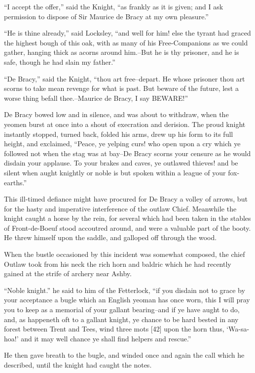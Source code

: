 ``I accept the offer,'' said the Knight, ``as frankly as it is given;
and I ask permission to dispose of Sir Maurice de Bracy at my own
pleasure.''

``He is thine already,'' said Locksley, ``and well for him! else the
tyrant had graced the highest bough of this oak, with as many of his
Free-Companions as we could gather, hanging thick as acorns around
him.--But he is thy prisoner, and he is safe, though he had slain my
father.''

``De Bracy,'' said the Knight, ``thou art free--depart. He whose
prisoner thou art scorns to take mean revenge for what is past. But
beware of the future, lest a worse thing befall thee.--Maurice de Bracy,
I say BEWARE!''

De Bracy bowed low and in silence, and was about to withdraw, when the
yeomen burst at once into a shout of execration and derision. The proud
knight instantly stopped, turned back, folded his arms, drew up his form
to its full height, and exclaimed, ``Peace, ye yelping curs! who open
upon a cry which ye followed not when the stag was at bay--De Bracy
scorns your censure as he would disdain your applause. To your brakes
and caves, ye outlawed thieves! and be silent when aught knightly or
noble is but spoken within a league of your fox-earths.''

This ill-timed defiance might have procured for De Bracy a volley of
arrows, but for the hasty and imperative interference of the outlaw
Chief. Meanwhile the knight caught a horse by the rein, for several
which had been taken in the stables of Front-de-Boeuf stood accoutred
around, and were a valuable part of the booty. He threw himself upon the
saddle, and galloped off through the wood.

When the bustle occasioned by this incident was somewhat composed, the
chief Outlaw took from his neck the rich horn and baldric which he had
recently gained at the strife of archery near Ashby.

``Noble knight.'' he said to him of the Fetterlock, ``if you disdain not
to grace by your acceptance a bugle which an English yeoman has once
worn, this I will pray you to keep as a memorial of your gallant
bearing--and if ye have aught to do, and, as happeneth oft to a gallant
knight, ye chance to be hard bested in any forest between Trent and
Tees, wind three mots {[}42{]} upon the horn thus, `Wa-sa-hoa!' and it
may well chance ye shall find helpers and rescue.''

He then gave breath to the bugle, and winded once and again the call
which he described, until the knight had caught the notes.

